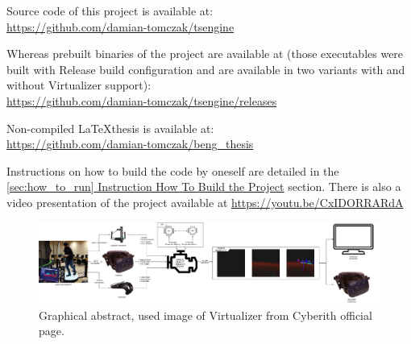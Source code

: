Source code of this project is available at:\\
\href{https://github.com/damian-tomczak/tsengine}{https://github.com/damian-tomczak/tsengine}

Whereas prebuilt binaries of the project are available at (those executables were built with Release build configuration and are available in two variants with and without Virtualizer support):\\
\href{https://github.com/damian-tomczak/tsengine/releases}{https://github.com/damian-tomczak/tsengine/releases}

Non-compiled \LaTeX thesis is available at:\\
\href{https://github.com/damian-tomczak/beng_thesis}{https://github.com/damian-tomczak/beng\_thesis}

Instructions on how to build the code by oneself are detailed in the \hyperref[sec:how_to_run]{\ref*{sec:how_to_run} Instruction How To Build the Project} section. There is also a video presentation of the project available at \href{https://youtu.be/CxIDORRARdA}{https://youtu.be/CxIDORRARdA}

\begin{figure}[H]
  \includegraphics[width=\linewidth]{figures/graphicalAbstract.png}
  \caption{Graphical abstract, used image of Virtualizer from Cyberith  official page\cite{virtualizer_image}.}
\end{figure}


\newpage

